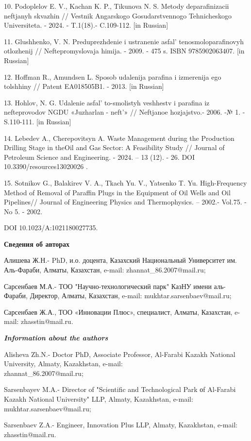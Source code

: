 \begin{refs}
10. Podoplelov E. V., Kachan K. P., Tikunova N. S. Metody deparafinizacii
neftjanyh skvazhin // Vestnik Angarskogo Gosudarstvennogo Tehnicheskogo
Universiteta. - 2024. - T.1(18).- C.109-112. {[}in Russian{]}

11. Glushhenko, V. N. Preduprezhdenie i ustranenie
asfal' tenosmoloparafinovyh otlozhenij //
Nefte\-promyslovaja himija. - 2009. - 475 s. ISBN 9785902063407. {[}in
Russian{]}

12. Hoffman R., Amundsen L. Sposob udalenija parafina i izmerenija ego
tolshhiny // Patent EA018505B1. - 2013. {[}in Russian{]}

13. Hohlov, N. G. Udalenie asfal' to-smolistyh veshhestv i
parafina iz nefteprovodov NGDU «Juzharlan - neft'» //
Neftjanoe hozjajstvo.- 2006. -№ 1. - S.110-111. {[}in Russian{]}

14. Lebedev A., Cherepovitsyn A. Waste Management during the Production
Drilling Stage in theOil and Gas Sector: A Feasibility Study // Journal
of Petroleum Science and Engineering. - 2024. -- 13 (12). - 26. DOI
10.3390/resources13020026 .

15. Sotnikov G., Balakirev V. A., Tkach Yu. V., Yatsenko T. Yu.
High-Frequency Method of Removal of Paraffin Plugs in the Equipment of
Oil Wells and Oil Pipelines// Journal of Engineering Physics and
Thermophysics. -- 2002.- Vol.75. - No 5. - 2002.

DOI 10.1023/A:1021180027735.
\end{refs}

\begin{info}
{\bfseries Сведения об авторах}

Алишева Ж.Н.- PhD, и.о. доцента, Казахский Национальный Университет им.
Аль-Фараби, Алматы, Казахстан, e-mail: zhannat\_86.2007@mail.ru;

Сарсенбаев М.А.- ТОО "Научно-технологический парк" КазНУ имени
аль-Фараби, Директор, Алматы, Казахстан, e-mail:
mukhtar.sarsenbaev@mail.ru;

Сарсенбаев Ж.А., ТОО «Инновации Плюс», специалист, Алматы, Казахстан,
e-mail: zhasstin@mail.ru.

\emph{{\bfseries Information about the authors}}

Alisheva Zh.N.- Doctor PhD, Associate Professor, Al-Farabi Kazakh
National University, Almaty, Kazakhstan, e-mail:\\
zhannat\_86.2007@mail.ru;

Sarsenbayev M.A.- Director of "Scientific and Technological Park оf
Al-Farabi Kazakh National University" LLP, Almaty, Kazakhstan, e-mail:
mukhtar.sarsenbaev@mail.ru;

Sarsenbaev Z.A.- Engineer, Innovation Plus LLP, Almaty, Kazakhstan,
e-mail: zhasstin@mail.ru.
\end{info}
